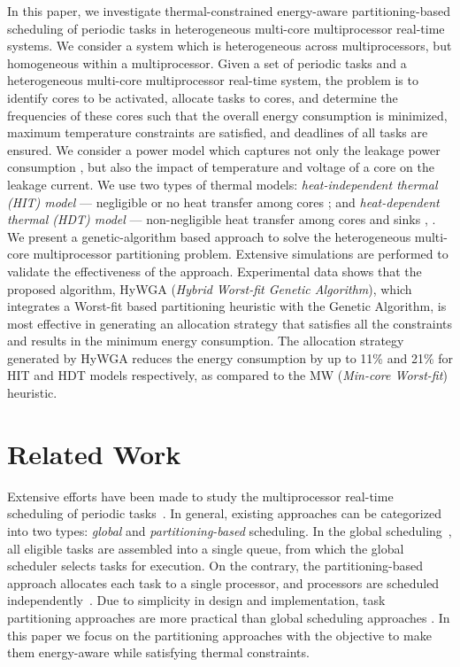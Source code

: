 \documentclass[conference]{IEEEtran}
\begin{document}
In this paper, we investigate thermal-constrained energy-aware partitioning-based scheduling of periodic tasks in heterogeneous multi-core multiprocessor real-time systems.
We consider a system which is heterogeneous across multiprocessors, but homogeneous within a multiprocessor. 
Given a set of periodic tasks and a heterogeneous multi-core multiprocessor real-time system, the problem is to identify cores to be activated, allocate tasks to cores, and determine the frequencies of these cores such that the overall energy consumption is minimized, maximum temperature constraints are satisfied, and deadlines of all tasks are ensured. 
We consider a power model which captures not only the leakage power consumption \cite{Langen09}, but also the impact of  temperature \cite{Fisher09} and voltage \cite{Quan10} of a core on the leakage current. 
We use two types of thermal models: \emph{heat-independent thermal (HIT) model}  --- negligible or no heat transfer 
among cores \cite{Quan10}; and 
\emph{heat-dependent thermal (HDT) model} --- non-negligible heat transfer among cores and sinks \cite{Chantem10}, \cite{Fisher09}. 
We present a genetic-algorithm based approach to solve the heterogeneous multi-core multiprocessor partitioning problem. 
Extensive simulations are performed to validate the effectiveness of the approach. Experimental data shows that the proposed algorithm,
HyWGA (\emph{Hybrid Worst-fit Genetic Algorithm}), 
which integrates a Worst-fit based partitioning heuristic with the Genetic Algorithm, %
is most effective in generating an allocation strategy that satisfies all the constraints and results in the minimum energy consumption. 
The allocation strategy generated by HyWGA reduces the energy 
consumption by up to 11\% and 21\% for HIT and HDT models respectively, as compared to the MW (\emph{Min-core Worst-fit}) heuristic.


\section{Related Work}

Extensive efforts have been made to study the multiprocessor real-time scheduling of periodic tasks~\cite{Carpenter04}. 
In general, existing approaches can be categorized into two types: \emph{global} and \emph{partitioning-based} scheduling. 
In the global scheduling~\cite{Baruah94}, all eligible tasks are assembled into a single queue, 
from which the global scheduler selects tasks for execution. 
On the contrary, the partitioning-based 
approach allocates each task to a single processor, %
and %
processors are scheduled independently~\cite{Baruah04}.
Due to simplicity in design and implementation, task partitioning approaches are more practical than global scheduling approaches \cite{Goraczko08}. 
In this paper we focus on the partitioning approaches with the objective to make them energy-aware while satisfying thermal constraints.
\end{document}
